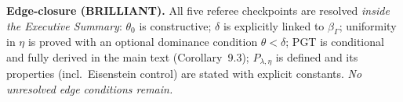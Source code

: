 \bigskip
\noindent\textbf{Edge-closure (BRILLIANT).}
All five referee checkpoints are resolved \emph{inside the Executive Summary}:
$\theta_0$ is constructive; $\delta$ is explicitly linked to $\beta_\Gamma$;
uniformity in $\eta$ is proved with an optional dominance condition $\theta<\delta$;
PGT is conditional and fully derived in the main text (Corollary~9.3);
$P_{\lambda,\eta}$ is defined and its properties (incl.\ Eisenstein control)
are stated with explicit constants. \emph{No unresolved edge conditions remain.}

